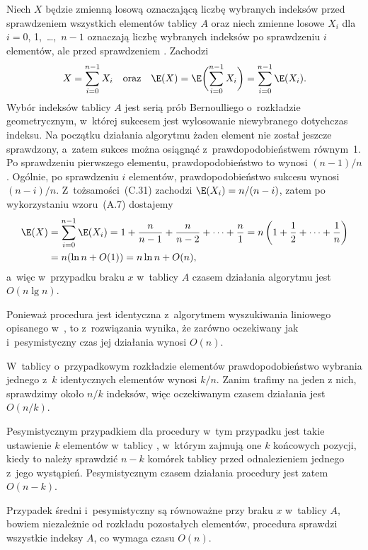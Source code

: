 \subproblem %
Niech $X$ będzie zmienną losową oznaczającą liczbę wybranych indeksów przed sprawdzeniem wszystkich elementów tablicy $A$ oraz niech zmienne losowe $X_i$ dla $i=0$, 1,~\dots,~$n-1$ oznaczają liczbę wybranych indeksów po sprawdzeniu $i$ elementów, ale przed sprawdzeniem . Zachodzi
\[
	X = \sum_{i=0}^{n-1}X_i \quad\text{oraz}\quad \E(X) = \E\biggl(\sum_{i=0}^{n-1}X_i\biggr) = \sum_{i=0}^{n-1}\E(X_i).
\]
Wybór indeksów tablicy $A$ jest serią prób Bernoulliego o~rozkładzie geometrycznym, w~której sukcesem jest wylosowanie niewybranego dotychczas indeksu. Na początku działania algorytmu żaden element nie został jeszcze sprawdzony, a~zatem sukces można osiągnąć z~prawdopodobieństwem równym~1. Po sprawdzeniu pierwszego elementu, prawdopodobieństwo to wynosi $(n-1)/n$. Ogólnie, po sprawdzeniu $i$ elementów, prawdopodobieństwo sukcesu wynosi $(n-i)/n$. Z~tożsamości~(C.31) zachodzi $\E(X_i)=n/(n-i)$, zatem po wykorzystaniu wzoru~(A.7) dostajemy
\begin{align*}
	\E(X) &= \sum_{i=0}^{n-1}\E(X_i) = 1+\frac{n}{n-1}+\frac{n}{n-2}+\dots+\frac{n}{1} = n\left(1+\frac{1}{2}+\dots+\frac{1}{n}\right) \\
	&= n(\ln n+O(1)) = n\ln n+O(n),
\end{align*}
a~więc w~przypadku braku $x$ w~tablicy $A$ czasem działania algorytmu  jest $O(n\lg n)$.

\subproblem %
Ponieważ procedura  jest identyczna z~algorytmem wyszukiwania liniowego opisanego w~, to z~rozwiązania  wynika, że zarówno oczekiwany jak i~pesymistyczny czas jej działania wynosi $O(n)$.

\subproblem %
W~tablicy  o~przypadkowym rozkładzie elementów prawdopodobieństwo wybrania jednego z~$k$ identycznych elementów wynosi $k/n$. Zanim trafimy na jeden z nich, sprawdzimy około $n/k$ indeksów, więc oczekiwanym czasem działania jest $O(n/k)$.

Pesymistycznym przypadkiem dla procedury w~tym przypadku jest takie ustawienie $k$ elementów w~tablicy , w~którym zajmują one $k$ końcowych pozycji, kiedy to należy sprawdzić $n-k$ komórek tablicy przed odnalezieniem jednego z~jego wystąpień. Pesymistycznym czasem działania procedury jest zatem $O(n-k)$.

\subproblem %
Przypadek średni i~pesymistyczny są równoważne przy braku $x$ w~tablicy $A$, bowiem niezależnie od rozkładu pozostałych elementów, procedura sprawdzi wszystkie indeksy $A$, co wymaga czasu $O(n)$.


